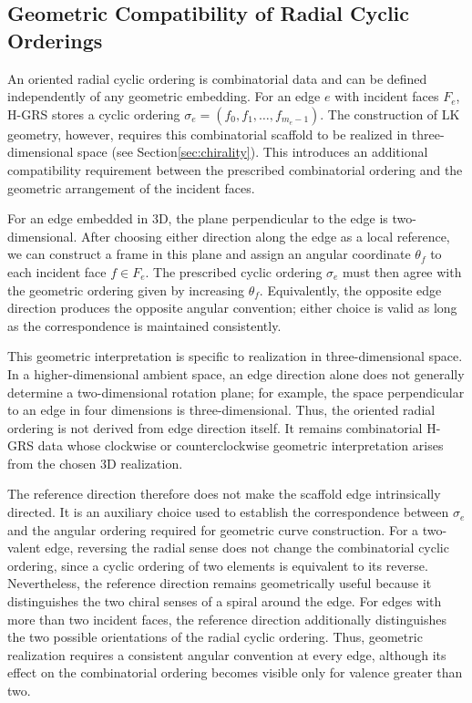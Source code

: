 \documentclass[acmtog]{acmart}
\begin{document}
\subsection{Geometric Compatibility of Radial Cyclic Orderings}

An oriented radial cyclic ordering is combinatorial data and can be defined independently of any geometric embedding. For an edge $e$ with incident faces $F_e$, H-GRS stores a cyclic ordering $\sigma_e=(f_0,f_1,\ldots,f_{m_e-1})$. The construction of LK geometry, however, requires this combinatorial scaffold to be realized in three-dimensional space 
(see Section\ref{sec:chirality}). This introduces an additional compatibility requirement between the prescribed combinatorial ordering and the geometric arrangement of the incident faces.

For an edge embedded in 3D, the plane perpendicular to the edge is two-dimensional. After choosing either direction along the edge as a local reference, we can construct a frame in this plane and assign an angular coordinate $\theta_f$ to each incident face $f\in F_e$. The prescribed cyclic ordering $\sigma_e$ must then agree with the geometric ordering given by increasing $\theta_f$. Equivalently, the opposite edge direction produces the opposite angular convention; either choice is valid as long as the correspondence is maintained consistently.

This geometric interpretation is specific to realization in three-dimensional space. In a higher-dimensional ambient space, an edge direction alone does not generally determine a two-dimensional rotation plane; for example, the space perpendicular to an edge in four dimensions is three-dimensional. Thus, the oriented radial ordering is not derived from edge direction itself. It remains combinatorial H-GRS data whose clockwise or counterclockwise geometric interpretation arises from the chosen 3D realization.

The reference direction therefore does not make the scaffold edge intrinsically directed. It is an auxiliary choice used to establish the correspondence between $\sigma_e$ and the angular ordering required for geometric curve construction. For a two-valent edge, reversing the radial sense does not change the combinatorial cyclic ordering, since a cyclic ordering of two elements is equivalent to its reverse. Nevertheless, the reference direction remains geometrically useful because it distinguishes the two chiral senses of a spiral around the edge. For edges with more than two incident faces, the reference direction additionally distinguishes the two possible orientations of the radial cyclic ordering. Thus, geometric realization requires a consistent angular convention at every edge, although its effect on the combinatorial ordering becomes visible only for valence greater than two.
\end{document}
